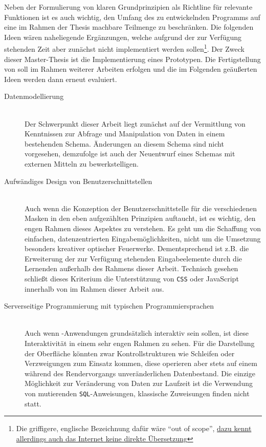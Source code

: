Neben der Formulierung von klaren Grundprinzipien als Richtline für relevante Funktionen ist es auch wichtig, den Umfang des zu entwickelnden Programms auf eine im Rahmen der Thesis machbare Teilmenge zu beschränken. Die folgenden Ideen wären naheliegende Ergänzungen, welche aufgrund der zur Verfügung stehenden Zeit aber zunächst nicht implementiert werden sollen\footnote{Die griffigere, englische Bezeichnung dafür wäre "`out of scope"', \href{http://german.stackexchange.com/questions/31085/german-equivalent-to-out-of-scope/}{dazu kennt allerdings auch das Internet keine direkte Übersetzung}}. Der Zweck dieser Master-Thesis ist die Implementierung eines Prototypen. Die Fertigstellung von \idename{} soll im Rahmen weiterer Arbeiten erfolgen und die im Folgenden geäußerten Ideen werden dann erneut evaluiert.

\begin{description}
\item[Datenmodellierung] \label{scope:no-data-modelling} \hfill \\
  Der Schwerpunkt dieser Arbeit liegt zunächst auf der Vermittlung von Kenntnissen zur Abfrage und Manipulation von Daten in einem bestehenden Schema. Änderungen an diesem Schema sind nicht vorgesehen, demzufolge ist auch der Neuentwurf eines Schemas mit externen Mitteln zu bewerkstelligen.
\item[Aufwändiges Design von Benutzerschnittstellen] \label{scope:no-design} \hfill \\
  Auch wenn die Konzeption der Benutzerschnittstelle für die verschiedenen Masken in den eben aufgezählten Prinzipien auftaucht, ist es wichtig, den engen Rahmen dieses Aspektes zu verstehen. Es geht um die Schaffung von einfachen, datenzentrierten Eingabemöglichkeiten, nicht um die Umsetzung besonders kreativer optischer Feuerwerke. Dementsprechend ist z.B. die Erweiterung der zur Verfügung stehenden Eingabeelemente durch die Lernenden außerhalb des Rahmens dieser Arbeit. Technisch gesehen schließt dieses Kriterium die Unterstützung von \texttt{CSS} oder JavaScript innerhalb von \idename{} im Rahmen dieser Arbeit aus.
\item[Serverseitige Programmierung mit typischen Programmiersprachen] \label{scope:no-programming} \hfill \\
  Auch wenn \idename{}-Anwendungen grundsätzlich interaktiv sein sollen, ist diese Interaktivität in einem sehr engen Rahmen zu sehen. Für die Darstellung der Oberfläche könnten zwar Kontrollstrukturen wie Schleifen oder Verzweigungen zum Einsatz kommen, diese operieren aber stets auf einem während des Rendervorgangs unveränderlichen Datenbestand. Die einzige Möglichkeit zur Veränderung von Daten zur Laufzeit ist die Verwendung von mutierenden \texttt{SQL}-Anweisungen, klassische Zuweisungen finden nicht statt.
\end{description}

